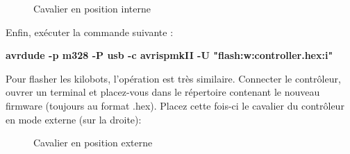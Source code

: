 \documentclass[a4paper,8pt]{report}
\begin{document}
\begin{figure}[!h]
    \centering
    \caption{Cavalier en position interne}
\end{figure}

Enfin, ex\'ecuter la commande suivante :\\

\begin{center}
  \textbf{avrdude -p m328  -P usb -c avrispmkII -U "flash:w:controller.hex:i"}
\end{center}

Pour flasher les kilobots, l'op\'eration est tr\`es similaire. Connecter le contr\^oleur, ouvrer un terminal et placez-vous dans le r\'epertoire contenant le nouveau firmware (toujours au format .hex). Placez cette fois-ci le cavalier du contr\^oleur en mode externe (sur la droite): \\

\begin{figure}[!h]
    \centering
    \caption{Cavalier en position externe}
\end{figure}
\end{document}
